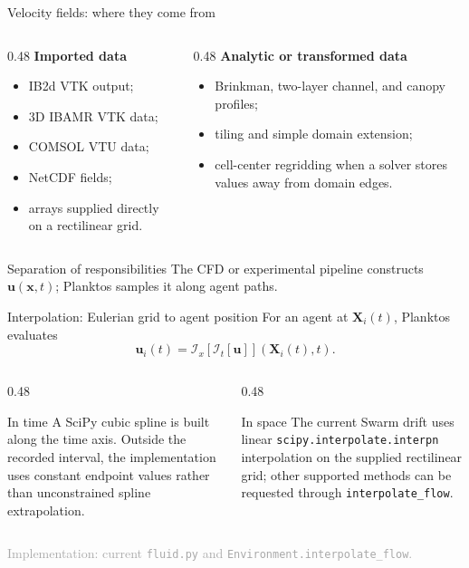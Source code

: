 \documentclass[aspectratio=169,11pt]{beamer}
\newcommand{\xx}{\bm{x}}
\newcommand{\XX}{\bm{X}}
\newcommand{\uu}{\bm{u}}
\newcommand{\sourcecredit}[1]{\vfill\hfill{\tiny\textcolor{DarkGray}{#1}}}
\newcommand{\code}[1]{\texttt{#1}}
\begin{document}
\begin{frame}{Velocity fields: where they come from}
\begin{columns}[T,onlytextwidth]
  \begin{column}{0.48\textwidth}
    \textbf{Imported data}
    \begin{itemize}
      \item IB2d VTK output;
      \item 3D IBAMR VTK data;
      \item COMSOL VTU data;
      \item NetCDF fields;
      \item arrays supplied directly on a rectilinear grid.
    \end{itemize}
  \end{column}
  \begin{column}{0.48\textwidth}
    \textbf{Analytic or transformed data}
    \begin{itemize}
      \item Brinkman, two-layer channel, and canopy profiles;
      \item tiling and simple domain extension;
      \item cell-center regridding when a solver stores values away from domain edges.
    \end{itemize}
  \end{column}
\end{columns}
\begin{block}{Separation of responsibilities}
The CFD or experimental pipeline constructs $\uu(\xx,t)$; Planktos samples it along agent paths.
\end{block}
\end{frame}

\begin{frame}{Interpolation: Eulerian grid to agent position}
For an agent at $\XX_i(t)$, Planktos evaluates
\[
  \uu_i(t)=\mathcal I_x\!\left[\mathcal I_t[\uu]\right](\XX_i(t),t).
\]
\begin{columns}[T,onlytextwidth]
  \begin{column}{0.48\textwidth}
    \begin{block}{In time}
      A SciPy cubic spline is built along the time axis. Outside the recorded interval, the implementation uses constant endpoint values rather than unconstrained spline extrapolation.
    \end{block}
  \end{column}
  \begin{column}{0.48\textwidth}
    \begin{block}{In space}
      The current Swarm drift uses linear \code{scipy.interpolate.interpn} interpolation on the supplied rectilinear grid; other supported methods can be requested through \code{interpolate\_flow}.
    \end{block}
  \end{column}
\end{columns}
\sourcecredit{Implementation: current \code{fluid.py} and \code{Environment.interpolate\_flow}.}
\end{frame}
\end{document}
